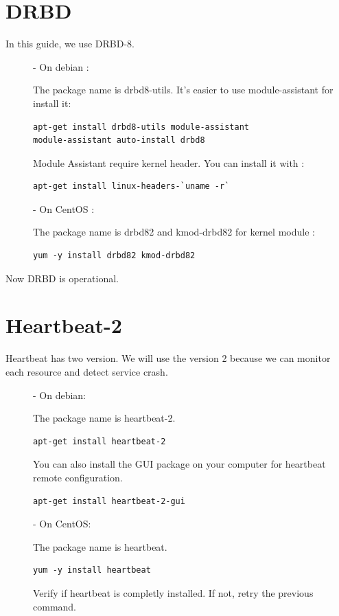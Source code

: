 \documentclass[a4paper,10pt]{report}
\begin{document}
\section{DRBD}
In this guide, we use DRBD-8.
\begin{description}
\item[]- On debian :

The package name is drbd8-utils. It's easier to use module-assistant for install it:
\begin{lstlisting}
apt-get install drbd8-utils module-assistant
module-assistant auto-install drbd8
\end{lstlisting} 



Module Assistant require kernel header. You can install it with :
\begin{lstlisting}
apt-get install linux-headers-`uname -r`
\end{lstlisting}

\item[]- On CentOS :

The package name is drbd82 and kmod-drbd82 for kernel module :
\begin{lstlisting}
yum -y install drbd82 kmod-drbd82
\end{lstlisting} 

\end{description}

Now DRBD is operational.


\section{Heartbeat-2}
Heartbeat has two version. We will use the version 2 because we can monitor each resource and detect service crash.
\begin{description}
\item[]- On debian:

The package name is heartbeat-2.
\begin{lstlisting}
apt-get install heartbeat-2
\end{lstlisting}
You can also install the GUI package on your computer for heartbeat remote configuration.
\begin{lstlisting}
apt-get install heartbeat-2-gui
\end{lstlisting}

\item[]- On CentOS:

The package name is heartbeat.
\begin{lstlisting}
yum -y install heartbeat
\end{lstlisting}
Verify if heartbeat is completly installed. If not, retry the previous command.

\end{description}
\end{document}
